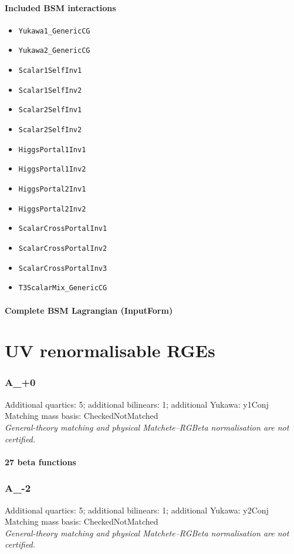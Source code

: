 \documentclass[10pt,a4paper]{article}
\begin{document}
\subsection*{Included BSM interactions}
\begin{itemize}
\item \texttt{Yukawa1\_GenericCG}
\item \texttt{Yukawa2\_GenericCG}
\item \texttt{Scalar1SelfInv1}
\item \texttt{Scalar1SelfInv2}
\item \texttt{Scalar2SelfInv1}
\item \texttt{Scalar2SelfInv2}
\item \texttt{HiggsPortal1Inv1}
\item \texttt{HiggsPortal1Inv2}
\item \texttt{HiggsPortal2Inv1}
\item \texttt{HiggsPortal2Inv2}
\item \texttt{ScalarCrossPortalInv1}
\item \texttt{ScalarCrossPortalInv2}
\item \texttt{ScalarCrossPortalInv3}
\item \texttt{T3ScalarMix\_GenericCG}
\end{itemize}
\subsection*{Complete BSM Lagrangian (InputForm)}

\clearpage
\part{UV renormalisable RGEs}
\clearpage
\section{A\_+0}
Additional quartics: 5; additional bilinears: 1; additional Yukawa: y1Conj\\
Matching mass basis: CheckedNotMatched\\
\emph{General-theory matching and physical Matchete--RGBeta normalisation are not certified.}
\subsection*{27 beta functions}

\clearpage
\section{A\_-2}
Additional quartics: 5; additional bilinears: 1; additional Yukawa: y2Conj\\
Matching mass basis: CheckedNotMatched\\
\emph{General-theory matching and physical Matchete--RGBeta normalisation are not certified.}
\end{document}

